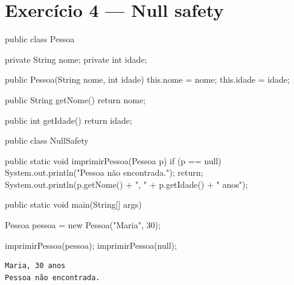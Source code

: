 \documentclass[11pt,a4paper]{article}
\begin{document}
\section{Exercício 4 --- Null safety}

\begin{javacode}
public class Pessoa {
    private String nome;
    private int idade;

    public Pessoa(String nome, int idade) {
        this.nome = nome;
        this.idade = idade;
    }

    public String getNome() {
        return nome;
    }

    public int getIdade() {
        return idade;
    }
}
\end{javacode}

\begin{javacode}
public class NullSafety {

    public static void imprimirPessoa(Pessoa p) {
        if (p == null) {
            System.out.println("Pessoa não encontrada.");
            return;
        }
        System.out.println(p.getNome() + ", " + p.getIdade() + " anos");
    }

    public static void main(String[] args) {
        Pessoa pessoa = new Pessoa("Maria", 30);

        imprimirPessoa(pessoa);
        imprimirPessoa(null);
    }
}
\end{javacode}

\begin{destaque}[Saída]
\begin{verbatim}
Maria, 30 anos
Pessoa não encontrada.
\end{verbatim}
\end{destaque}
\end{document}

